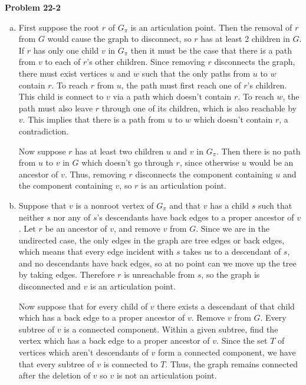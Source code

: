 \documentclass{article}
\begin{document}
\noindent\textbf{Problem 22-2}\\
\begin{enumerate}[a.]
\item First suppose the root $r$ of $G_\pi$ is an articulation point. Then the removal of $r$ from $G$ would cause the graph to disconnect, so $r$ has at least 2 children in $G$.  If $r$ has only one child $v$ in $G_\pi$ then it must be the case that there is a path from $v$ to each of $r$'s other children. Since removing $r$ disconnects the graph, there must exist vertices $u$ and $w$ such that the only paths from $u$ to $w$ contain $r$. To reach $r$ from $u$, the path must first reach one of $r$'s children. This child is connect to $v$ via a path which doesn't contain $r$. To reach $w$, the path must also leave $r$ through one of its children, which is also reachable by $v$. This implies that there is a path from $u$ to $w$ which doesn't contain $r$, a contradiction.

Now suppose $r$ has at least two children $u$ and $v$ in $G_\pi$.  Then there is no path from $u$ to $v$ in $G$ which doesn't go through $r$, since otherwise $u$ would be an ancestor of $v$.  Thus, removing $r$ disconnects the component containing $u$ and the component containing $v$, so $r$ is an articulation point. \\

\item Suppose that $v$ is a nonroot vertex of $G_\pi$ and that $v$ has a child $s$ such that neither $s$ nor any of $s$'s descendants have back edges to a proper ancestor of $v$. Let $r$ be an ancestor of $v$, and remove $v$ from $G$.   Since we are in the undirected case, the only edges in the graph are tree edges or back edges, which means that every edge incident with $s$ takes us to a descendant of $s$, and no descendants have back edges, so at no point can we move up the tree by taking edges.  Therefore $r$ is unreachable from $s$, so the graph is disconnected and $v$ is an articulation point.  

Now suppose that for every child of $v$ there exists a descendant of that child which has a back edge to a proper ancestor of $v$.  Remove $v$ from $G$. Every subtree of $v$ is a connected component.  Within a given subtree, find the vertex which has a back edge to a proper ancestor of $v$.  Since the set $T$ of vertices which aren't descendants of $v$ form a connected component, we have that every subtree of $v$ is connected to $T$.  Thus, the graph remains connected after the deletion of $v$ so $v$ is not an articulation point. \\


\end{enumerate}
\end{document}
